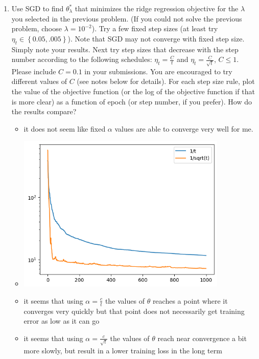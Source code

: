 \documentclass{article}
\begin{document}
\begin{enumerate}
\item Use SGD to find $\theta_{\lambda}^{*}$ that minimizes the ridge regression
objective for the $\lambda$ you selected in the previous
problem. (If you could not solve the previous problem, choose $\lambda=10^{-2}$). Try a few fixed step sizes (at least try $\eta_{t}\in\left\{ 0.05,.005\right\} $).
Note that SGD may not converge with fixed step size. Simply note your
results. Next try step sizes that decrease with the step number according
to the following schedules: $\eta_{t}=\frac{C}{t}$ and $\eta_{t}=\frac{C}{\sqrt{t}}$, $C \leq 1$. Please include $C = 0.1$ in your submissions. You are encouraged to try different values of $C$ (see notes below for details).
For each step size rule, plot the value of the objective function
(or the log of the objective function if that is more clear) as a
function of epoch (or step number, if you prefer). How do the results compare?
\begin{itemize}
    \item it does not seem like fixed $\alpha$ values are able to converge very well for me.
    \item \includegraphics[width=10cm]{homework/homework_2/immages/25_1.png}
    \item it seems that using $\alpha=\frac{c}{t}$ the values of $\theta$ reaches a point where it converges very quickly but that point does not necessarily get training error as low as it can go
    \item it seems that using $\alpha=\frac{c}{\sqrt{t}}$ the values of $\theta$ reach near convergence a bit more slowly, but result in a lower training loss in the long term
    
\end{itemize}
\setcounter{saveenum}{\value{enumi}}
\end{enumerate}
\end{document}

